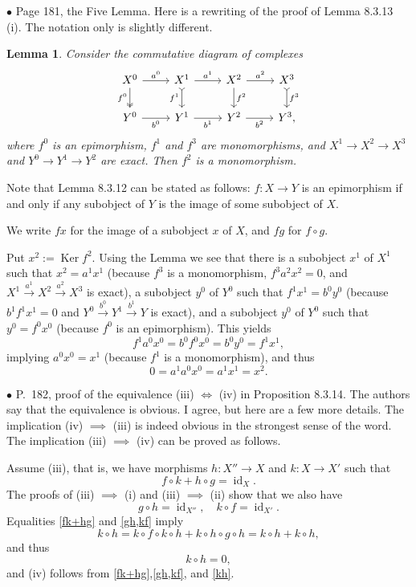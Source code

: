 \documentclass[12pt]{article}
\newtheorem{lem}[thm]{Lemma}
\theoremstyle{remark}%
\newcommand{\bu}{\bullet}
\newcommand{\n}{\noindent}
\newcommand{\pf}{\n{\em Proof. }}
\newcommand{\be}{\begin{equation}}
\newcommand{\ee}{\end{equation}}
\newcommand{\bl}{\begin{lem}}
\newcommand{\el}{\end{lem}}
\DeclareMathOperator{\id}{id}
\DeclareMathOperator{\Ker}{Ker}
\begin{document}
\n$\bu$ Page 181, the Five Lemma. Here is a rewriting of the proof of Lemma 8.3.13 (i). The notation only is slightly different. 
%
\bl 
Consider the commutative diagram of complexes 
$$
\begin{tikzcd}
X^0\arrow[two heads]{d}[swap]{f^0}\arrow{r}{a^0}&
X^1\arrow[tail]{d}[swap]{f^1}\arrow{r}{a^1}&
X^2\arrow{d}{f^2}\arrow{r}{a^2}&
X^3\arrow[tail]{d}{f^3}\\ 
Y^0\arrow{r}[swap]{b^0}&
Y^1\arrow{r}[swap]{b^1}&
Y^2\arrow{r}[swap]{b^2}&
Y^3,
\end{tikzcd}
$$
where $f^0$ is an epimorphism, $f^1$ and $f^3$ are monomorphisms, and $X^1\to X^2\to X^3$ and $Y^0\to Y^1\to Y^2$ are exact. Then $f^2$ is a monomorphism. 
\el 
% 
\pf Note that Lemma 8.3.12 can be stated as follows: $f:X\to Y$ is an epimorphism if and only if any subobject of $Y$ is the image of some subobject of $X$. 

We write $fx$ for the image of a subobject $x$ of $X$, and $fg$ for $f\circ g$.

Put $x^2:=\Ker f^2$. Using the Lemma we see that there is a subobject $x^1$ of $X^1$ such that $x^2=a^1x^1$ (because $f^3$ is a monomorphism, $f^3a^2x^2=0$, and $X^1\overset{a^1}{\to}X^2\overset{a^2}{\to}X^3$ is exact), a subobject $y^0$ of $Y^0$ such that $f^1x^1=b^0y^0$ (because $b^1f^1x^1=0$ and $Y^0\overset{b^0}{\to}Y^1\overset{b^1}{\to}Y$ is exact), and a subobject $y^0$ of $Y^0$ such that $y^0=f^0x^0$ (because $f^0$ is an epimorphism). This yields  
$$
f^1a^0x^0=b^0f^0x^0=b^0y^0=f^1x^1,
$$
implying $a^0x^0=x^1$ (because $f^1$ is a monomorphism), and thus 
$$
0=a^1a^0x^0=a^1x^1=x^2.
$$ 


\n$\bu$ P.~182, proof of the equivalence (iii) $\iff$ (iv) in Proposition 8.3.14. The authors say that the equivalence is obvious. I agree, but here are a few more details. The implication (iv) $\implies$ (iii) is indeed obvious in the strongest sense of the word. The implication (iii) $\implies$ (iv) can be proved as follows. 

Assume (iii), that is, we have morphisms $h:X''\to X$ and $k:X\to X'$ such that 
\be\label{fk+hg} 
f\circ k+h\circ g=\id_X.
\ee 
The proofs of (iii) $\implies$ (i) and (iii) $\implies$ (ii) show that we also have 
\be\label{gh,kf} 
g\circ h=\id_{X''},\quad k\circ f=\id_{X'}.
\ee 
Equalities \eqref{fk+hg} and \eqref{gh,kf} imply 
$$
k\circ h=k\circ f\circ k\circ h+k\circ h\circ g\circ h=k\circ h+k\circ h,
$$ 
and thus 
\be\label{kh} 
k\circ h=0, 
\ee 
and (iv) follows from  \eqref{fk+hg},\eqref{gh,kf}, and \eqref{kh}. 
\end{document}
